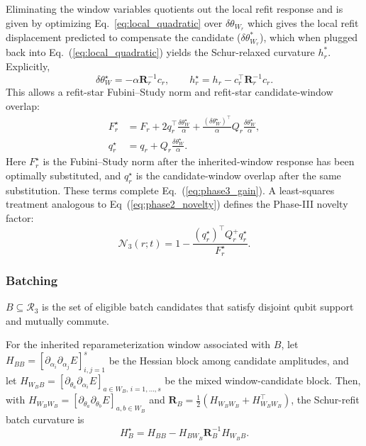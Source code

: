 \documentclass[
  reprint,
  amsmath,
  amssymb,
  aps,
  pra,
  nofootinbib,
  superscriptaddress,
  floatfix
]{revtex4-2}
\begin{document}
Eliminating the window variables quotients out the local refit response and is given by optimizing Eq.~\ref{eq:local_quadratic} over $\delta\theta_{W_r}$ which gives the local refit displacement predicted to compensate the candidate ($\delta\theta^*_{W_r}$), which when plugged back into Eq.~(\ref{eq:local_quadratic}) yields the Schur-relaxed curvature $h^*_r$. Explicitly,
\begin{equation}
\delta\theta_W^\star=-\alpha\mathbf R_r^{-1}c_r,
\qquad
h_r^\star=h_r-c_r^{\top}\mathbf R_r^{-1}c_r .
\label{eq:phase3_schur_response}
\end{equation}
 This allows a refit-star Fubini--Study norm and refit-star candidate-window overlap:
\begin{equation}
\begin{aligned}
F_r^\star
&=F_r+2q_r^{\top}\frac{\delta\theta_W^\star}{\alpha}
+\frac{(\delta\theta_W^\star)^{\top}}{\alpha}Q_r\frac{\delta\theta_W^\star}{\alpha},\\
q_r^\star
&=q_r+Q_r\frac{\delta\theta_W^\star}{\alpha}.
\end{aligned}
\label{eq:phase3_star_geometry}
\end{equation}
Here $F_r^\star$ is the Fubini--Study norm after the inherited-window response has been optimally substituted, and $q_r^\star$ is the candidate-window overlap after the same substitution. These terms complete Eq.~(\ref{eq:phase3_gain}). A least-squares treatment analogous to Eq~(\ref{eq:phase2_novelty}) defines the Phase-III novelty factor:
\begin{equation}
\mathcal N_3(r;t)=1-\frac{(q_r^\star)^{\top}Q_r^+q_r^\star}
{F_r^\star}.
\label{eq:phase3_novelty}
\end{equation}

\subsubsection{Batching}

$B\subseteq\mathcal R_3$ is the set of eligible batch candidates that satisfy disjoint qubit support and mutually commute.

For the inherited reparameterization window associated with $B$, let $H_{BB}=[\partial_{\alpha_i}\partial_{\alpha_j}E]_{i,j=1}^s$ be the Hessian block among candidate amplitudes, and let $H_{W_BB}=[\partial_{\theta_a}\partial_{\alpha_i}E]_{a\in W_B,\,i=1,\ldots,s}$ be the mixed window-candidate block. Then, with $H_{W_BW_B}=[\partial_{\theta_a}\partial_{\theta_b}E]_{a,b\in W_B}$ and $\mathbf R_B=\frac12(H_{W_BW_B}+H_{W_BW_B}^{\top})$, the Schur-refit batch curvature is
\begin{equation}
H_B^\star
=
H_{BB}
-
H_{BW_B}\mathbf R_B^{-1}H_{W_BB}.
\label{eq:batch_schur_curvature}
\end{equation}
\end{document}
